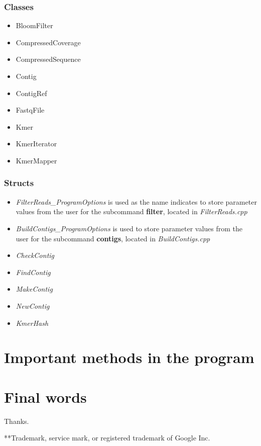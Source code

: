 \documentclass[a4paper]{report}
\renewcommand{\b}[1]{\textbf{#1}}  %
\renewcommand{\i}[1]{\textit{#1}}  %
\newcommand{\e}[1]{\emph{#1}}    %
\begin{document}
\subsection{Classes}
\begin{itemize}
\item BloomFilter 
\item CompressedCoverage  
\item CompressedSequence  
\item Contig  
\item ContigRef   
\item FastqFile   
\item Kmer    
\item KmerIterator    
\item KmerMapper  
\end{itemize}

\subsection{Structs}
\begin{itemize}
\item \i{FilterReads\_ProgramOptions} is used as the name indicates to store parameter values from the user 
        for the subcommand \b{filter}, located in \e{FilterReads.cpp}
\item \i{BuildContigs\_ProgramOptions} is used to store parameter values from the user for 
    the subcommand \b{contigs}, located in \e{BuildContigs.cpp}
\item \i{CheckContig} 
\item \i{FindContig}  
\item \i{MakeContig}
\item \i{NewContig}
\item \i{KmerHash}
\end{itemize}

\chapter{Important methods in the program}


\chapter{Final words}

Thanks.

\vfill

**Trademark, service mark, or registered trademark of Google Inc.
\printbibliography                                                                                                                                   
\end{document}

